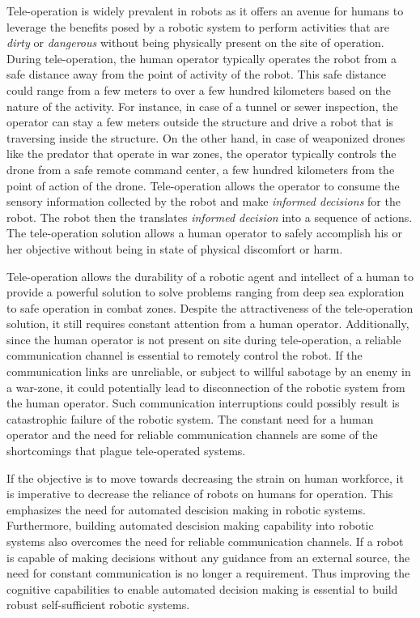 \documentclass {udthesis}
\begin{document}
Tele-operation is widely prevalent in robots as it offers an avenue for humans to leverage the benefits posed by a robotic system to perform activities 
that are \emph{dirty} or \emph{dangerous} without being physically present on the site of operation. During tele-operation, the human operator 
typically operates the robot from a safe distance away from the point of activity of the robot. This safe distance could range from a few meters to over a few hundred kilometers based on the nature of the activity. For instance, in case of a tunnel or sewer inspection, the operator can stay a few meters outside the structure and drive a robot that is traversing inside the structure. On the other hand, in case of weaponized drones like the predator \cite{predator} that operate in war zones, the operator typically controls the drone from a safe remote command center, a few hundred kilometers from the point of action of the drone. Tele-operation allows the operator to consume the sensory information collected by the robot and make \emph{informed decisions} for the robot. The robot then the translates \emph{informed decision} into a sequence of actions. The tele-operation solution allows a human operator to safely accomplish his or her objective 
without being in state of physical discomfort or harm. 

Tele-operation allows the durability of a robotic agent and intellect of a human to provide a powerful solution to solve problems ranging from deep sea exploration to safe operation in combat zones. Despite the attractiveness of the tele-operation solution, it still requires constant attention from
a human operator. Additionally, since the human operator is not present on site during tele-operation, a reliable communication channel is essential to remotely control the robot. If the communication links are unreliable, or subject to willful sabotage by an enemy in a war-zone, it could potentially lead to disconnection of the robotic system from the human operator. Such communication interruptions could possibly result is catastrophic failure of the robotic system. The constant need for a human operator and the need for reliable communication channels are some of the shortcomings that plague tele-operated systems.

If the objective is to move towards decreasing the strain on human workforce, it is imperative to decrease the reliance of robots on humans for operation. This emphasizes the need for automated descision making in robotic systems. Furthermore, building automated descision making capability into robotic systems also overcomes the need for reliable communication channels. If a robot is capable of making decisions without any guidance from an external source, the need for constant communication is no longer a requirement.
Thus improving the cognitive capabilities to enable automated decision making is essential to build robust self-sufficient robotic systems.
\end{document}
